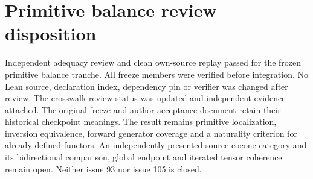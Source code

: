 \documentclass{article}
\begin{document}
\section*{Primitive balance review disposition}
Independent adequacy review and clean own-source replay passed for the frozen primitive balance tranche. All freeze members were verified before integration. No Lean source, declaration index, dependency pin or verifier was changed after review. The crosswalk review status was updated and independent evidence attached. The original freeze and author acceptance document retain their historical checkpoint meanings.
The result remains primitive localization, inversion equivalence, forward generator coverage and a naturality criterion for already defined functors. An independently presented source cocone category and its bidirectional comparison, global endpoint and iterated tensor coherence remain open. Neither issue 93 nor issue 105 is closed.
\end{document}
